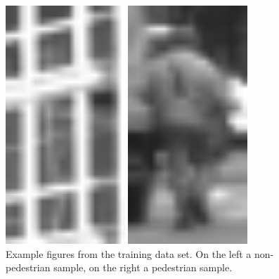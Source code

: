\documentclass[journal,twocolumn]{IEEEtran}
\begin{document}
\begin{figure}[h]
\begin{minipage}{0.45\columnwidth}
\centering
\includegraphics[keepaspectratio,width=0.4\textwidth]{1}
\end{minipage}
\begin{minipage}{0.45\columnwidth}
\centering
\includegraphics[keepaspectratio,width=0.4\textwidth]{2}
\end{minipage}
\caption[Example images from the dataset]{Example figures from the training data set. On the left a non-pedestrian sample, on the right a pedestrian sample.}
\end{figure}
\end{document}
